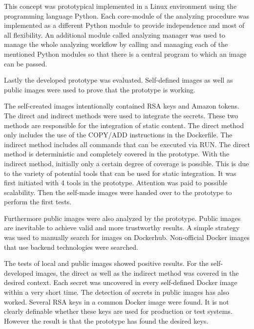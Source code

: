 This concept was prototypical implemented in a Linux environment using the programming language Python.
Each core-module of the analyzing procedure was implemented as a different Python module to provide independence and most of all flexibility. 
An additional module called analyzing manager was used to manage the whole analyzing workflow by calling and managing each of the mentioned Python modules so that there is a central program to which an image can be passed.

Lastly the developed prototype was evaluated. 
Self-defined images as well as public images were used to prove that the prototype is working.

The self-created images intentionally contained RSA keys and Amazon tokens.
The direct and indirect methods were used to integrate the secrets.
These two methods are responsible for the integration of static content.
The direct method only includes the use of the COPY/ADD instructions in the Dockerfile.
The indirect method includes all commands that can be executed via RUN.
The direct method is deterministic and completely covered in the prototype.
With the indirect method, initially only a certain degree of coverage is possible.
This is due to the variety of potential tools that can be used for static integration.
It was first initiated with 4 tools in the prototype. Attention was paid to possible scalability.
Then the self-made images were handed over to the prototype to perform the first tests.

Furthermore public images were also analyzed by the prototype.
Public images are inevitable to achieve valid and more trustworthy results.
A simple strategy was used to manually search for images on Dockerhub.
Non-official Docker images that use backend technologies were searched.

The tests of local and public images showed positive results.
For the self-developed images, the direct as well as the indirect method was covered in the desired context.
Each secret was uncovered in every self-defined Docker image within a very short time.
The detection of secrets in public images has also worked.
Several RSA keys in a common Docker image were found.
It is not clearly definable whether these keys are used for production or test systems.
However the result is that the prototype has found the desired keys.





